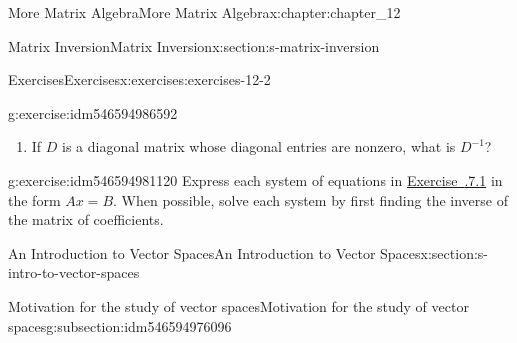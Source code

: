 \documentclass[oneside,10pt,]{book}
\newcommand{\xreffont}{\relax}
\numberwithin{equation}{section}
\renewcommand{\vec}[1]{\mathbf{#1}}
\begin{document}
\begin{chapterptx}{More Matrix Algebra}{}{More Matrix Algebra}{}{}{x:chapter:chapter_12}
\begin{sectionptx}{Matrix Inversion}{}{Matrix Inversion}{}{}{x:section:s-matrix-inversion}
\begin{exercises-subsection}{Exercises}{}{Exercises}{}{}{x:exercises:exercises-12-2}
\begin{divisionexercise}{4}{}{}{g:exercise:idm546594986592}
\begin{enumerate}[label=(\alph*)]
\begin{multicols}{2}
\begin{enumerate}[label=(\roman*)]
\item{}\(\left(
\begin{array}{ccc}
2 & 0 & 0 \\
0 & 3 & 0 \\
0 & 0 & 5 \\
\end{array}
\right)\)%
\item{}\(\left(
\begin{array}{cccc}
-1 & 0 & 0 & 0 \\
0 & \frac{5}{2} & 0 & 0 \\
0 & 0 & \frac{1}{7} & 0 \\
0 & 0 & 0 & \frac{3}{4} \\
\end{array}
\right)\)%
\end{enumerate}
\end{multicols}
%
\item{}If \(D\) is a diagonal matrix whose diagonal entries are nonzero, what is \(D^{-1}\)?%
\end{enumerate}
%
\end{divisionexercise}%
\begin{divisionexercise}{5}{}{}{g:exercise:idm546594981120}%
Express each system of equations in \hyperlink{x:exercise:exercise-12-1-1}{Exercise~{\xreffont 12.1.7.1}} in the form \(A x = B\). When possible, solve each system by first finding the inverse of the matrix of coefficients.%
\end{divisionexercise}%
\end{exercises-subsection}
\end{sectionptx}
%
%
\typeout{************************************************}
\typeout{************************************************}
%
\begin{sectionptx}{An Introduction to Vector Spaces}{}{An Introduction to Vector Spaces}{}{}{x:section:s-intro-to-vector-spaces}
%
%
%
\typeout{************************************************}
\typeout{************************************************}
%
\begin{subsectionptx}{Motivation for the study of vector spaces}{}{Motivation for the study of vector spaces}{}{}{g:subsection:idm546594976096}
\(\renewcommand{\vec}[1]{\mathbf{#1}}\)%
\par

\end{subsectionptx}
\end{sectionptx}
\end{chapterptx}
\end{document}

